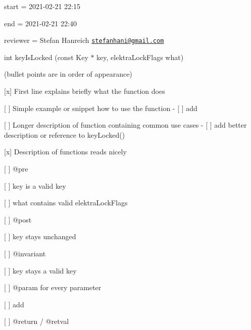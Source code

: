
\begin{DoxyItemize}
\item start = 2021-\/02-\/21 22\+:15
\item end = 2021-\/02-\/21 22\+:40
\item reviewer = Stefan Hanreich \href{mailto:stefanhani@gmail.com}{\tt stefanhani@gmail.\+com}
\end{DoxyItemize}

{\ttfamily int key\+Is\+Locked (const Key $\ast$ key, elektra\+Lock\+Flags what)}

(bullet points are in order of appearance)


\begin{DoxyItemize}
\item \mbox{[}x\mbox{]} First line explains briefly what the function does
\item \mbox{[} \mbox{]} Simple example or snippet how to use the function -\/ \mbox{[} \mbox{]} add
\item \mbox{[} \mbox{]} Longer description of function containing common use cases -\/ \mbox{[} \mbox{]} add better description or reference to {\ttfamily key\+Locked()}
\item \mbox{[}x\mbox{]} Description of functions reads nicely
\item \mbox{[} \mbox{]} {\ttfamily @pre}
\begin{DoxyItemize}
\item \mbox{[} \mbox{]} {\ttfamily key} is a valid key
\item \mbox{[} \mbox{]} {\ttfamily what} contains valid elektra\+Lock\+Flags
\end{DoxyItemize}
\item \mbox{[} \mbox{]} {\ttfamily @post}
\begin{DoxyItemize}
\item \mbox{[} \mbox{]} {\ttfamily key} stays unchanged
\end{DoxyItemize}
\item \mbox{[} \mbox{]} {\ttfamily @invariant}
\begin{DoxyItemize}
\item \mbox{[} \mbox{]} {\ttfamily key} stays a valid key
\end{DoxyItemize}
\item \mbox{[} \mbox{]} {\ttfamily @param} for every parameter
\begin{DoxyItemize}
\item \mbox{[} \mbox{]} add
\end{DoxyItemize}
\item \mbox{[} \mbox{]} {\ttfamily @return} / {\ttfamily @retval}

\end{DoxyItemize}
